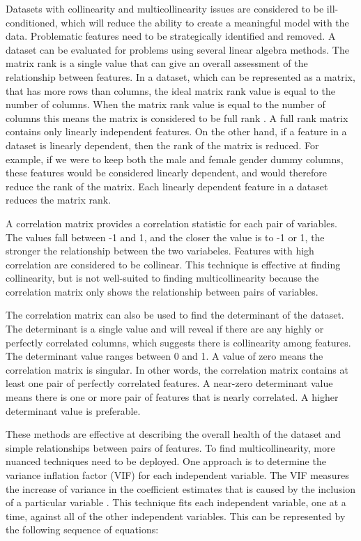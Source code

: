 \documentclass[sigconf]{acmart}
\begin{document}
Datasets with collinearity and multicollinearity issues are considered to be ill-conditioned, which will reduce the ability to create a meaningful model with the data. Problematic features need to be strategically identified and removed. A dataset can be evaluated for problems using several linear algebra methods. The matrix rank is a single value that can give an overall assessment of the relationship between features. In a dataset, which can be represented as a matrix, that has more rows than columns, the ideal matrix rank value is equal to the number of columns. When the matrix rank value is equal to the number of columns this means the matrix is considered to be full rank \cite{cite14}. A full rank matrix contains only linearly independent features. On the other hand, if a feature in a dataset is linearly dependent, then the rank of the matrix is reduced. For example, if we were to keep both the male and female gender dummy columns, these features would be considered linearly dependent, and would therefore reduce the rank of the matrix. Each linearly dependent feature in a dataset reduces the matrix rank.

A correlation matrix provides a correlation statistic for each pair of variables. The values fall between -1 and 1, and the closer the value is to -1 or 1, the stronger the relationship between the two variabeles. Features with high correlation are considered to be collinear. This technique is effective at finding collinearity, but is not well-suited to finding multicollinearity because the correlation matrix only shows the relationship between pairs of variables.

The correlation matrix can also be used to find the determinant of the dataset. The determinant is a single value and  will reveal if there are any highly or perfectly correlated columns, which suggests there is collinearity among features. The determinant value ranges between 0 and 1. A value of zero means the correlation matrix is singular. In other words, the correlation matrix contains at least one pair of perfectly correlated features. A near-zero determinant value means there is one or more pair of features that is nearly correlated. A higher determinant value is preferable.

These methods are effective at describing the overall health of the dataset and simple relationships between pairs of features. To find multicollinearity, more nuanced techniques need to be deployed. One approach is to determine the variance inflation factor (VIF) for each independent variable. The VIF measures the increase of variance in the coefficient estimates that is caused by the inclusion of a particular variable \cite{cite15}. This technique fits each independent variable, one at a time, against all of the other independent variables. This can be represented by the following sequence of equations:
\end{document}
